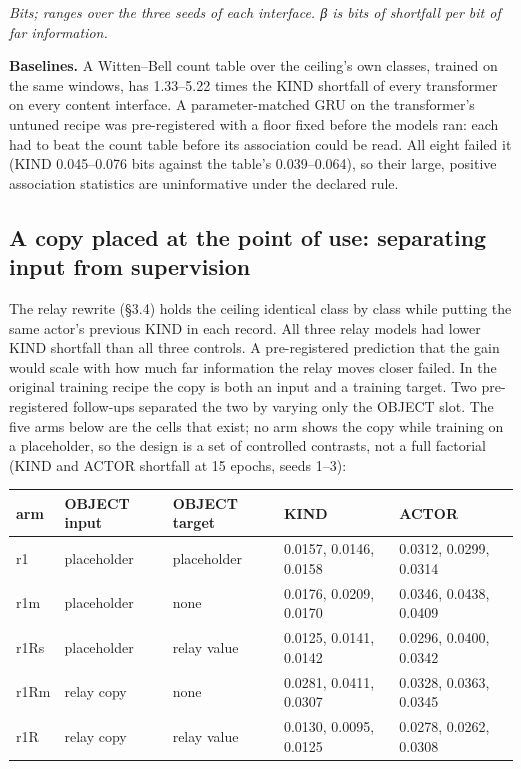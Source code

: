 \documentclass[10pt]{article}
\begin{document}
\emph{Bits; ranges over the three seeds of each interface. β is bits of shortfall per bit of far information.}

\textbf{Baselines.} A Witten--Bell count table over the ceiling's own classes, trained on the same windows, has 1.33--5.22 times
the KIND shortfall of every transformer on every content interface. A parameter-matched GRU on the transformer's untuned recipe
was pre-registered with a floor fixed before the models ran: each had to beat the count table before its association
could be read. All eight failed it (KIND 0.045--0.076 bits against the table's 0.039--0.064), so their large, positive
association statistics are uninformative under the declared rule.

\hypertarget{a-copy-placed-at-the-point-of-use-separating-input-from-supervision}{%
\subsection{A copy placed at the point of use: separating input from supervision}\label{a-copy-placed-at-the-point-of-use-separating-input-from-supervision}}

The relay rewrite (§3.4) holds the ceiling identical class by class while putting the same actor's previous KIND in each
record. All three relay models had lower KIND shortfall than all three controls. A pre-registered prediction that the gain
would scale with how much far information the relay moves closer failed. In the original training recipe the copy is
both an input and a training target. Two pre-registered follow-ups separated the two by varying only the OBJECT slot.
The five arms below are the cells that exist; no arm shows the copy while training on a placeholder, so the design is a
set of controlled contrasts, not a full factorial (KIND and ACTOR shortfall at 15 epochs, seeds 1--3):

\begin{longtable}[]{@{}lllll@{}}
\toprule
arm & OBJECT input & OBJECT target & KIND & ACTOR\tabularnewline
\midrule
\endhead
r1 & placeholder & placeholder & 0.0157, 0.0146, 0.0158 & 0.0312, 0.0299, 0.0314\tabularnewline
r1m & placeholder & none & 0.0176, 0.0209, 0.0170 & 0.0346, 0.0438, 0.0409\tabularnewline
r1Rs & placeholder & relay value & 0.0125, 0.0141, 0.0142 & 0.0296, 0.0400, 0.0342\tabularnewline
r1Rm & relay copy & none & 0.0281, 0.0411, 0.0307 & 0.0328, 0.0363, 0.0345\tabularnewline
r1R & relay copy & relay value & 0.0130, 0.0095, 0.0125 & 0.0278, 0.0262, 0.0308\tabularnewline
\bottomrule
\end{longtable}
\end{document}
